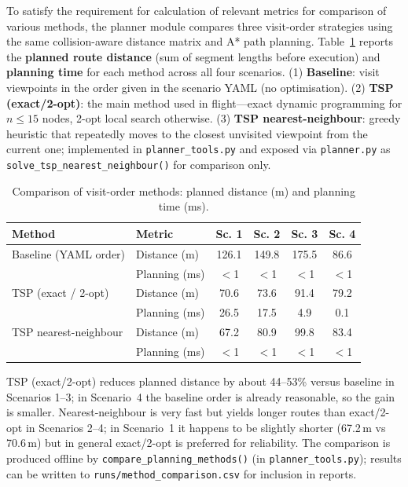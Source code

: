 \documentclass[11pt,a4paper]{article}
\begin{document}
To satisfy the requirement for calculation of relevant metrics for comparison of various methods, the planner module compares three visit-order strategies using the same collision-aware distance matrix and A* path planning. Table~\ref{tab:methods} reports the \textbf{planned route distance} (sum of segment lengths before execution) and \textbf{planning time} for each method across all four scenarios. (1) \textbf{Baseline}: visit viewpoints in the order given in the scenario YAML (no optimisation). (2) \textbf{TSP (exact/2-opt)}: the main method used in flight---exact dynamic programming for $n \leq 15$ nodes, 2-opt local search otherwise. (3) \textbf{TSP nearest-neighbour}: greedy heuristic that repeatedly moves to the closest unvisited viewpoint from the current one; implemented in \texttt{planner\_tools.py} and exposed via \texttt{planner.py} as \texttt{solve\_tsp\_nearest\_neighbour()} for comparison only.

\begin{table}[H]
\centering
\caption{Comparison of visit-order methods: planned distance (m) and planning time (ms).}
\label{tab:methods}
\begin{tabular}{llcccc}
\toprule
\textbf{Method} & \textbf{Metric} & \textbf{Sc. 1} & \textbf{Sc. 2} & \textbf{Sc. 3} & \textbf{Sc. 4} \\
\midrule
Baseline (YAML order)  & Distance (m)   & 126.1 & 149.8 & 175.5 & 86.6 \\
                       & Planning (ms)  & $<$1  & $<$1  & $<$1  & $<$1 \\
TSP (exact / 2-opt)    & Distance (m)   & 70.6  & 73.6  & 91.4  & 79.2 \\
                       & Planning (ms)  & 26.5  & 17.5  & 4.9   & 0.1 \\
TSP nearest-neighbour  & Distance (m)   & 67.2  & 80.9  & 99.8  & 83.4 \\
                       & Planning (ms)  & $<$1  & $<$1  & $<$1  & $<$1 \\
\bottomrule
\end{tabular}
\end{table}

TSP (exact/2-opt) reduces planned distance by about 44--53\% versus baseline in Scenarios 1--3; in Scenario~4 the baseline order is already reasonable, so the gain is smaller. Nearest-neighbour is very fast but yields longer routes than exact/2-opt in Scenarios 2--4; in Scenario~1 it happens to be slightly shorter (67.2\,m vs 70.6\,m) but in general exact/2-opt is preferred for reliability. The comparison is produced offline by \texttt{compare\_planning\_methods()} (in \texttt{planner\_tools.py}); results can be written to \texttt{runs/method\_comparison.csv} for inclusion in reports.
\end{document}
